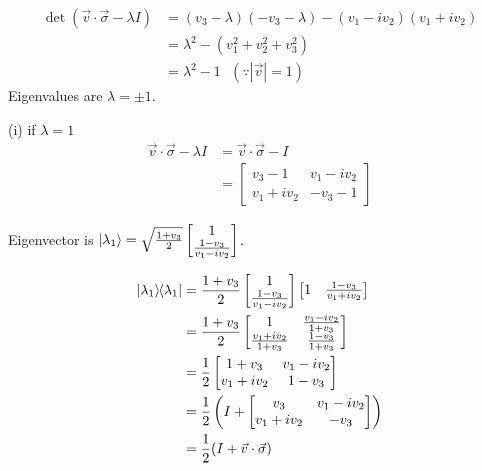\begin{align*}
\det (\vec{v} \cdot \vec{\sigma}  - \lambda I) &= (v_3 - \lambda) (-v_3 - \lambda) - (v_1 - iv_2) (v_1 + iv_2)\\
&= \lambda^2 - (v_1^2 + v_2^2  + v_3^2)\\
&= \lambda^2 - 1 ~~~ (\because |\vec{v}| = 1)
\end{align*}
Eigenvalues are $\lambda = \pm 1$.


(i) if $\lambda = 1$
\begin{align*}
	\vec{v} \cdot \vec{\sigma}  - \lambda I &= \vec{v} \cdot \vec{\sigma}  - I\\	
		&= \begin{bmatrix}
		v_3 - 1 & v_1 - i v_2 \\ 
		v_1 + i v_2 & - v_3 - 1
		\end{bmatrix}
\end{align*}

Eigenvector is $\ket{\lambda_1} = \sqrt{ \frac{1+v_3}{2 }} \begin{bmatrix}
1 \\ 
\frac{1-v_3}{v_1 - iv_2}
\end{bmatrix} $.

\begin{align*}
	\kb{\lambda_1} &= \frac{1+v_3}{2 } \begin{bmatrix}
		1 \\ 
		\frac{1-v_3}{v_1 - iv_2}
		\end{bmatrix}
		\begin{bmatrix}
		1 &
		\frac{1-v_3}{v_1 + iv_2}
		\end{bmatrix}\\
%
	&=
	 \frac{1+v_3}{2 } \begin{bmatrix}
	 1 & \frac{v_1 - iv_2}{1 + v_3} \\ 
	 \frac{v_1 + iv_2}{1 + v_3} & \frac{1-v_3}{1+v_3}
	 \end{bmatrix} \\
	 &=
	 \frac{1}{2} \begin{bmatrix}
	 1+v_3 & v_1 - iv_2 \\ 
	 v_1 + iv_2 & 1 - v_3
	 \end{bmatrix} \\
	 &=
	  \frac{1}{2} \left( I + \begin{bmatrix}
	 v_3 & v_1 - iv_2 \\ 
	 v_1 + iv_2 & - v_3
	 \end{bmatrix} \right) \\
	 &=
	 \frac{1}{2} (I + \vec{v} \cdot \vec{\sigma} )
\end{align*}



